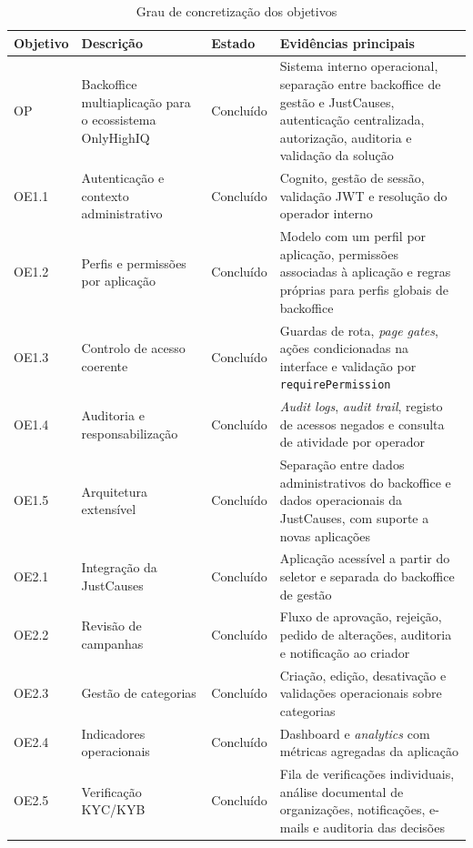 \begin{table}[H]
\caption{Grau de concretização dos objetivos}
\label{tab:objetivos}
\begin{center}
\scriptsize
\begin{tabular}{|p{1.5cm}|p{4.1cm}|p{1.4cm}|p{5cm}|}
\hline
\textbf{Objetivo} & \textbf{Descrição} & \textbf{Estado} & \textbf{Evidências principais} \\ \hline
OP & Backoffice multiaplicação para o ecossistema OnlyHighIQ & Concluído & Sistema interno operacional, separação entre backoffice de gestão e JustCauses, autenticação centralizada, autorização, auditoria e validação da solução \\ \hline
OE1.1 & Autenticação e contexto administrativo & Concluído & Cognito, gestão de sessão, validação JWT e resolução do operador interno \\ \hline
OE1.2 & Perfis e permissões por aplicação & Concluído & Modelo com um perfil por aplicação, permissões associadas à aplicação e regras próprias para perfis globais de backoffice \\ \hline
OE1.3 & Controlo de acesso coerente & Concluído & Guardas de rota, \textit{page gates}, ações condicionadas na interface e validação por \texttt{requirePermission} \\ \hline
OE1.4 & Auditoria e responsabilização & Concluído & \textit{Audit logs}, \textit{audit trail}, registo de acessos negados e consulta de atividade por operador \\ \hline
OE1.5 & Arquitetura extensível & Concluído & Separação entre dados administrativos do backoffice e dados operacionais da JustCauses, com suporte a novas aplicações \\ \hline
OE2.1 & Integração da JustCauses & Concluído & Aplicação acessível a partir do seletor e separada do backoffice de gestão \\ \hline
OE2.2 & Revisão de campanhas & Concluído & Fluxo de aprovação, rejeição, pedido de alterações, auditoria e notificação ao criador \\ \hline
OE2.3 & Gestão de categorias & Concluído & Criação, edição, desativação e validações operacionais sobre categorias \\ \hline
OE2.4 & Indicadores operacionais & Concluído & Dashboard e \textit{analytics} com métricas agregadas da aplicação \\ \hline
OE2.5 & Verificação KYC/KYB & Concluído & Fila de verificações individuais, análise documental de organizações, notificações, e-mails e auditoria das decisões \\ \hline
\end{tabular}
\end{center}
\end{table}


